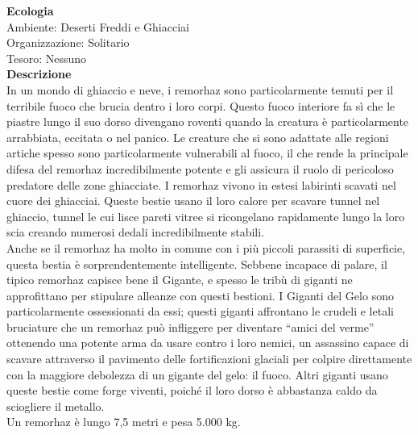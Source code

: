 \begin{multicols}{2}
\textbf{Ecologia}\\
Ambiente: Deserti Freddi e Ghiacciai\\
Organizzazione: Solitario\\
Tesoro: Nessuno\\
\textbf{Descrizione}\\
In un mondo di ghiaccio e neve, i remorhaz sono particolarmente temuti per il terribile fuoco che brucia dentro i loro corpi. Questo fuoco interiore fa sì che le piastre lungo il suo dorso divengano roventi quando la creatura è particolarmente arrabbiata, eccitata o nel panico. Le creature che si sono adattate alle regioni artiche spesso sono particolarmente vulnerabili al fuoco, il che rende la principale difesa del remorhaz incredibilmente potente e gli assicura il ruolo di pericoloso predatore delle zone ghiacciate. I remorhaz vivono in estesi labirinti scavati nel cuore dei ghiacciai. Queste bestie usano il loro calore per scavare tunnel nel ghiaccio, tunnel le cui lisce pareti vitree si ricongelano rapidamente lungo la loro scia creando numerosi dedali incredibilmente stabili.\\

Anche se il remorhaz ha molto in comune con i più piccoli parassiti di superficie, questa bestia è sorprendentemente intelligente. Sebbene incapace di palare, il tipico remorhaz capisce bene il Gigante, e spesso le tribù di giganti ne approfittano per stipulare alleanze con questi bestioni. I Giganti del Gelo sono particolarmente ossessionati da essi; questi giganti affrontano le crudeli e letali bruciature che un remorhaz può infliggere per diventare “amici del verme” ottenendo una potente arma da usare contro i loro nemici, un assassino capace di scavare attraverso il pavimento delle fortificazioni glaciali per colpire direttamente con la maggiore debolezza di un gigante del gelo: il fuoco. Altri giganti usano queste bestie come forge viventi, poiché il loro dorso è abbastanza caldo da sciogliere il metallo.\\
Un remorhaz è lungo 7,5 metri e pesa 5.000 kg.\\


\end{multicols}

